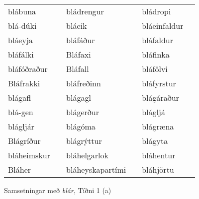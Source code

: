 \documentclass[../samsetningasafn.tex]{subfiles}
\begin{document}
\begin{wordlist}[H]
\begin{tcolorbox}
\begin{tabular}{BlBlBl}
		blábuna		&		& 
		bládrengur	&		& 
		bládropi		&		\\  %
		blá-dúki		&		& 
		bláeik		&		& 
		bláeinfaldur	&		\\  %
		bláeyja		&		& 
		bláfáður		&		& 
		bláfaldur	&		\\  %
		bláfálki		&		& 
		Bláfaxi		&		& 
		bláfinka		&		\\  %
		bláfóðraður	&		& 
		Bláfall		&		& 
		bláfölvi		&		\\  %
		Bláfrakki		&		& 
		bláfreðinn	&		& 
		bláfyrstur	&		\\  %
		blágafl		&		& 
		blágagl		&		& 
		blágáraður	&		\\  %
		blá-gen		&		& 
		blágerður	&		& 
		blágljá		&		\\  %
		blágljár		&		& 
		blágóma		&		& 
		blágræna	&		\\  %
		Blágríður	&		& 
		blágrýttur	&		& 
		blágyta		&		\\  %
		bláheimskur &		& 
		bláhelgarlok	&		& 
		bláhentur	&		\\  %
		Bláher		&		& 
		bláheyskapartími &	& 
		bláhjörtu	&		  %
	\end{tabular}
\end{tcolorbox}
	\caption{Samsetningar með \textit{blár}, Tíðni 1 (a)}
	\label{listi:blatt.1a}
\end{wordlist}		
\end{document}
